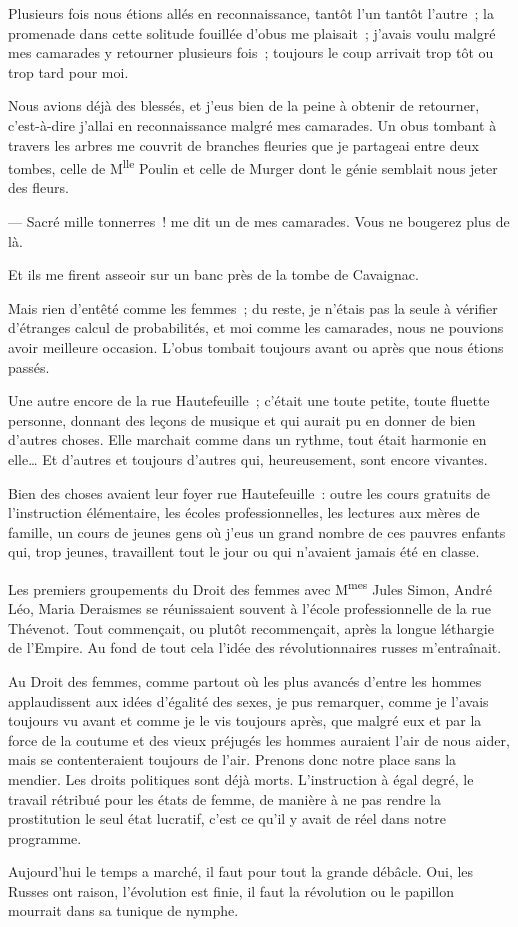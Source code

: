 \documentclass[french,twoside]{book} %
\newcommand\chapterclose{} %
\begin{document}
Plusieurs fois nous étions allés en reconnaissance, tantôt l’un tantôt l’autre ; la promenade dans cette solitude fouillée d’obus me plaisait ; j’avais voulu malgré mes camarades y retourner plusieurs fois ; toujours le coup arrivait trop tôt ou trop tard pour moi.\par
Nous avions déjà des blessés, et j’eus bien de la peine à obtenir de retourner, c’est-à-dire  j’allai en reconnaissance malgré mes camarades. Un obus tombant à travers les arbres me couvrit de branches fleuries que je partageai entre deux tombes, celle de M\textsuperscript{lle} Poulin et celle de Murger dont le génie semblait nous jeter des fleurs.\par
— Sacré mille tonnerres ! me dit un de mes camarades. Vous ne bougerez plus de là.\par
Et ils me firent asseoir sur un banc près de la tombe de Cavaignac.\par
Mais rien d’entêté comme les femmes ; du reste, je n’étais pas la seule à vérifier d’étranges calcul de probabilités, et moi comme les camarades, nous ne pouvions avoir meilleure occasion. L’obus tombait toujours avant ou après que nous étions passés.\par
Une autre encore de la rue Hautefeuille ; c’était une toute petite, toute fluette personne, donnant des leçons de musique et qui aurait pu en donner de bien d’autres choses. Elle marchait comme dans un rythme, tout était harmonie en elle… Et d’autres et toujours d’autres qui, heureusement, sont encore vivantes.\par
Bien des choses avaient leur foyer rue Hautefeuille : outre les cours gratuits de l’instruction élémentaire, les écoles professionnelles, les lectures aux mères de famille, un cours de jeunes gens où j’eus un grand nombre de ces pauvres  enfants qui, trop jeunes, travaillent tout le jour ou qui n’avaient jamais été en classe.\par
Les premiers groupements du Droit des femmes avec M\textsuperscript{mes} Jules Simon, André Léo, Maria Deraismes se réunissaient souvent à l’école professionnelle de la rue Thévenot. Tout commençait, ou plutôt recommençait, après la longue léthargie de l’Empire. Au fond de tout cela l’idée des révolutionnaires russes m’entraînait.\par
Au Droit des femmes, comme partout où les plus avancés d’entre les hommes applaudissent aux idées d’égalité des sexes, je pus remarquer, comme je l’avais toujours vu avant et comme je le vis toujours après, que malgré eux et par la force de la coutume et des vieux préjugés les hommes auraient l’air de nous aider, mais se contenteraient toujours de l’air. Prenons donc notre place sans la mendier. Les droits politiques sont déjà morts. L’instruction à égal degré, le travail rétribué pour les états de femme, de manière à ne pas rendre la prostitution le seul état lucratif, c’est ce qu’il y avait de réel dans notre programme.\par
Aujourd’hui le temps a marché, il faut pour tout la grande débâcle. Oui, les Russes ont raison, l’évolution est finie, il faut la révolution ou le papillon mourrait dans sa tunique de nymphe.
\chapterclose
\end{document}
